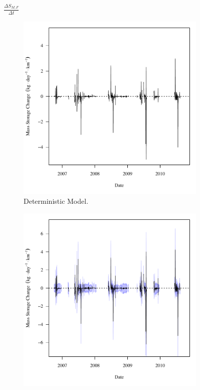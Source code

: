 \begin{linenumbers}
\subfiguretop
\begin{landscape}
	\begin{figure}
		$ \displaystyle \frac{\Delta S_{M,F}}{\Delta t} $
		\begin{subfigure}{0.7\textwidth}
			\centering
			\includegraphics[width=\tableCustomSize]{"Figures/Results_DSR/Deterministic/f Segment F"}
			\caption{Deterministic Model.}
		\end{subfigure}%
		\begin{subfigure}{0.7\textwidth}
			\centering
			\includegraphics[width=\tableCustomSize]{"Figures/Results_DSR/Stochastic/f Segment F"}

\end{subfigure}
\end{figure}
\end{landscape}
\end{linenumbers}

